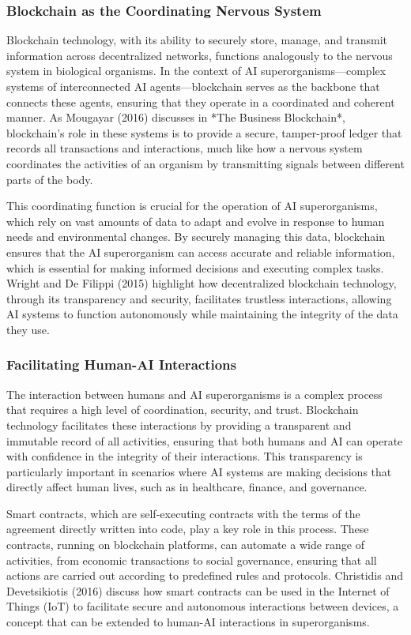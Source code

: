 \documentclass[12pt,twoside]{article}
\begin{document}
\subsubsection{Blockchain as the Coordinating Nervous System}

Blockchain technology, with its ability to securely store, manage, and transmit information across decentralized networks, functions analogously to the nervous system in biological organisms. In the context of AI superorganisms—complex systems of interconnected AI agents—blockchain serves as the backbone that connects these agents, ensuring that they operate in a coordinated and coherent manner. As Mougayar (2016) discusses in *The Business Blockchain*, blockchain’s role in these systems is to provide a secure, tamper-proof ledger that records all transactions and interactions, much like how a nervous system coordinates the activities of an organism by transmitting signals between different parts of the body.

This coordinating function is crucial for the operation of AI superorganisms, which rely on vast amounts of data to adapt and evolve in response to human needs and environmental changes. By securely managing this data, blockchain ensures that the AI superorganism can access accurate and reliable information, which is essential for making informed decisions and executing complex tasks. Wright and De Filippi (2015) highlight how decentralized blockchain technology, through its transparency and security, facilitates trustless interactions, allowing AI systems to function autonomously while maintaining the integrity of the data they use.

\subsubsection{Facilitating Human-AI Interactions}

The interaction between humans and AI superorganisms is a complex process that requires a high level of coordination, security, and trust. Blockchain technology facilitates these interactions by providing a transparent and immutable record of all activities, ensuring that both humans and AI can operate with confidence in the integrity of their interactions. This transparency is particularly important in scenarios where AI systems are making decisions that directly affect human lives, such as in healthcare, finance, and governance.

Smart contracts, which are self-executing contracts with the terms of the agreement directly written into code, play a key role in this process. These contracts, running on blockchain platforms, can automate a wide range of activities, from economic transactions to social governance, ensuring that all actions are carried out according to predefined rules and protocols. Christidis and Devetsikiotis (2016) discuss how smart contracts can be used in the Internet of Things (IoT) to facilitate secure and autonomous interactions between devices, a concept that can be extended to human-AI interactions in superorganisms.
\end{document}
